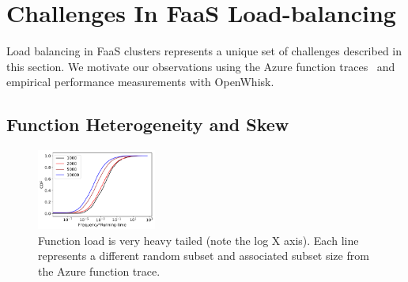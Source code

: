 
\section{Challenges In FaaS Load-balancing}
\label{sec:challenges}
Load balancing in FaaS clusters represents a unique set of challenges described in this section.
We motivate our observations using the Azure function traces~\cite{Shahrad:ATC:2020:ServerlessInTheWild} and empirical performance measurements with OpenWhisk.  



\subsection{Function Heterogeneity and Skew}


\begin{figure}
  \centering
  \includegraphics[width=0.35\textwidth]{../figs/freqs-all.pdf}
  \caption{Function load is very heavy tailed (note the log X axis). Each line represents a different random subset and associated subset size from the Azure function trace. }
  \label{fig:freqs}
\end{figure}

